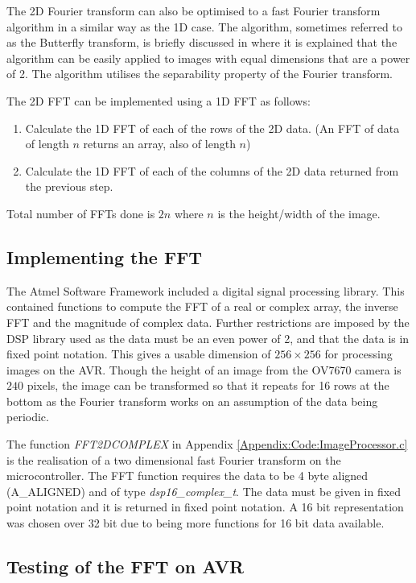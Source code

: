 The 2D Fourier transform can also be optimised to a fast Fourier transform algorithm in a similar way as the 1D case. The algorithm, sometimes referred to as the Butterfly transform, is briefly discussed in \cite{nixon2012feature} where it is explained that the algorithm can be easily applied to images with equal dimensions that are a power of 2. The algorithm utilises the separability property of the Fourier transform. 

The 2D FFT can be implemented using a 1D FFT as follows:
\begin{enumerate}
\item Calculate the 1D FFT of each of the rows of the 2D data. (An FFT of data of length $n$ returns an array, also of length $n$)
\item Calculate the 1D FFT of each of the columns of the 2D data returned from the previous step.
\end{enumerate}
Total number of FFTs done is $2n$ where $n$ is the height/width of the image. 
\subsection{Implementing the FFT}
The Atmel Software Framework \citep{Atmel:ASF} included a digital signal processing library. This contained functions to compute the FFT of a real or complex array, the inverse FFT and the magnitude of complex data. Further restrictions are imposed by the DSP library used as the data must be an even power of 2, and that the data is in fixed point notation. This gives a usable dimension of $256 \times 256$ for processing images on the AVR. Though the height of an image from the OV7670 camera is $240$ pixels, the image can be transformed so that it repeats for 16 rows at the bottom as the Fourier transform works on an assumption of the data being periodic.

The function \textit{FFT2DCOMPLEX} in Appendix \ref{Appendix:Code:ImageProcessor.c} is the realisation of a two dimensional fast Fourier transform on the microcontroller. The FFT function requires the data to be 4 byte aligned (A\_ALIGNED) and of type \textit{dsp16\_complex\_t}. The data must be given in fixed point notation and it is returned in fixed point notation. A 16 bit representation was chosen over 32 bit due to being more functions for 16 bit data available. 


\subsection{Testing of the FFT on AVR}
